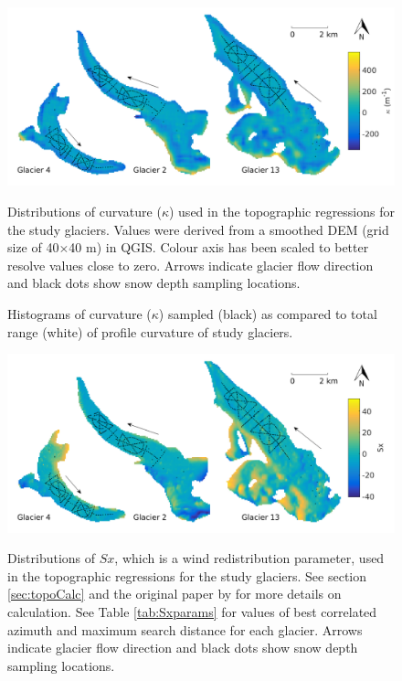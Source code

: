 \documentclass{sfuthesis}
\newcommand{\topomap}{Arrows indicate glacier flow direction and black dots show snow depth sampling locations. }
\begin{document}
\begin{figure}[H]
	\centering
	\includegraphics[width=\textwidth]{Map_curvature.png}\\
	\caption{Distributions of curvature ($\kappa$) used in the topographic regressions for the study glaciers. Values were derived from a smoothed DEM (grid size of 40$\times$40 m) in QGIS. Colour axis has been scaled to better resolve values close to zero. \topomap}
	\label{map:curvature}
\end{figure}

\begin{figure}[H]
	\caption{Histograms of curvature ($\kappa$) sampled (black) as compared to total range (white) of profile curvature of study glaciers.}
	\label{sampledRange:curvature}
\end{figure}

\begin{figure}[H]
	\centering
	\includegraphics[width=\textwidth]{Map_Sx.png}\\
	\caption{Distributions of $Sx$, which is a wind redistribution parameter, used in the topographic regressions for the study glaciers. See section \ref{sec:topoCalc} and the original paper by \cite{Winstral2002} for more details on calculation. See Table \ref{tab:Sxparams} for values of best correlated azimuth and maximum search distance for each glacier. \topomap }
	\label{map:Sx}
\end{figure}
\end{document}
